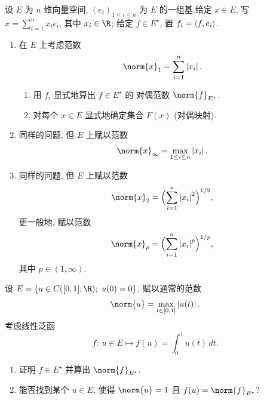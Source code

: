 \begin{exercise}
\label{exer:1.2}
设 $E$ 为 $n$ 维向量空间, $(e_i)_{1\le i\le n}$ 为 $E$ 的一组基.给定 $x\in E$, 写
$x=\sum_{i=1}^n x_ie_i$, 其中 $x_i\in\R$; 给定 $f\in E^\star$, 置 $f_i=\left\langle f,e_i\right\rangle$.

\begin{enumerate}[label=\arabic*., leftmargin=2.2em, itemsep=0.25em]
	\item 在 $E$ 上考虑范数
	      \begin{equation*}
	      \norm{x}_1=\sum_{i=1}^n\abs{x_i}.
	      \end{equation*}
	      \begin{enumerate}[label=(\alph*), leftmargin=2.0em, itemsep=0.2em]
	      	\item 用 $f_i$ 显式地算出 $f\in E^\star$ 的
对偶范数 $\norm{f}_{E^\star}$.
	      	\item 对每个 $x\in E$ 显式地确定集合 $F(x)$ (对偶映射).
	      \end{enumerate}
	\item 同样的问题, 但 $E$ 上赋以范数
	      \begin{equation*}
	      \norm{x}_\infty=\max_{1\le i\le n}\abs{x_i}.
	      \end{equation*}
	\item 同样的问题, 但 $E$ 上赋以范数
	      \begin{equation*}
	      \norm{x}_2=\Bigl(\sum_{i=1}^n\abs{x_i}^2\Bigr)^{1/2},
	      \end{equation*}
	      更一般地, 赋以范数
	      \begin{equation*}
	      \norm{x}_p=\Bigl(\sum_{i=1}^n\abs{x_i}^p\Bigr)^{1/p},
	      \end{equation*}
	      其中 $p\in(1,\infty)$.
\end{enumerate}
\end{exercise}

\begin{exercise}
\label{exer:1.3}
设 $E=\{u\in C([0,1];\R);\ u(0)=0\}$, 赋以通常的范数
\begin{equation*}
\norm{u}=\max_{t\in[0,1]}\abs{u(t)}.
\end{equation*}
考虑线性泛函
\begin{equation*}
f:\ u\in E\mapsto f(u)=\int_0^1 u(t)\,dt.
\end{equation*}

\begin{enumerate}[label=\arabic*., leftmargin=2.2em, itemsep=0.25em]
	\item 证明 $f\in E^\star$ 并算出 $\norm{f}_{E^\star}$.
	\item 能否找到某个 $u\in E$, 使得 $\norm{u}=1$ 且 $f(u)=\norm{f}_{E^\star}$?
\end{enumerate}
\end{exercise}

